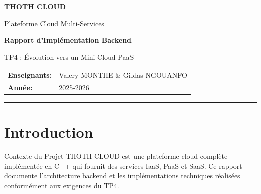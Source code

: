 \documentclass[12pt,a4paper]{article}
\begin{document}
\begin{titlepage}
    \centering
    \vspace*{2cm}
    
    {\Huge\bfseries\color{primaryBlue} THOTH CLOUD\par}
    \vspace{0.5cm}
    {\Large\color{secondaryGreen} Plateforme Cloud Multi-Services\par}
    \vspace{2cm}
    
    {\LARGE\bfseries\color{darkBlue} Rapport d'Implémentation Backend\par}
    \vspace{0.5cm}
    {\large\color{accentTeal} TP4 : Évolution vers un Mini Cloud PaaS\par}
    \vspace{3cm}
    
    
    \vfill
    
    {\large
    \begin{tabular}{ll}
        \textbf{\color{primaryBlue}Enseignants:} & \color{darkBlue}Valery MONTHE \& Gildas NGOUANFO \\
        \textbf{\color{primaryBlue}Année:} & \color{darkBlue}2025-2026 \\
    \end{tabular}
    }
    
    \vspace{1cm}
    {\color{accentTeal}\rule{0.8\textwidth}{2pt}}
\end{titlepage}

\tableofcontents
\newpage

\section{Introduction}

\begin{infobox}{Contexte du Projet}
THOTH CLOUD est une plateforme cloud complète implémentée en C++ qui fournit des services IaaS, PaaS et SaaS. Ce rapport documente l'architecture backend et les implémentations techniques réalisées conformément aux exigences du TP4.
\end{infobox}
\end{document}
